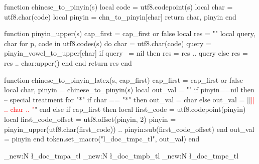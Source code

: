 \begin{luacode*}
function chinese_to_pinyin(s)
    local code = utf8.codepoint(s)
    local char = utf8.char(code)
    local pinyin = chn_to_pinyin[char]
    return char, pinyin
end


function pinyin_upper(s)
    cap_first = cap_first or false
    local res = ""
    local query, char
    for p, code in utf8.codes(s) do
        char = utf8.char(code)
        query = pinyin_vowel_to_upper[char]
        if query ~= nil then
            res = res .. query
        else
            res = res .. char:upper()
        end
    end
    return res
end

function chinese_to_pinyin_latex(s, cap_first)
    cap_first = cap_first or false
    local char, pinyin = chinese_to_pinyin(s)
    local out_val  = ""
    if pinyin==nil then
        -- special treatment for "*"
        if char == "*" then
            out_val = char
        else
            out_val = [[\textcolor{red}{]] .. char .. "}"
        end
    else
        if cap_first then
            local first_code = utf8.codepoint(pinyin)
            local first_code_offset = utf8.offset(pinyin, 2)
            pinyin = pinyin_upper(utf8.char(first_code)) .. pinyin:sub(first_code_offset)
        end
        out_val = pinyin
    end
    token.set_macro("l_doc_tmpc_tl", out_val)
end



\end{luacode*}

\newcommand{\latintopinyin}[1]{%
    \directlua{
        local pinyin_table = latin_to_pinyin("\luaescapestring{#1}")
        tex.print(table.concat(pinyin_table, " "))
    }%
}

\ExplSyntaxOn

\tl_new:N \l_doc_tmpa_tl
\tl_new:N \l_doc_tmpb_tl
\tl_new:N \l_doc_tmpc_tl



\newcommand{\pinyin}[2]{
    \latintopinyin{#2}\space
}

\ExplSyntaxOff
